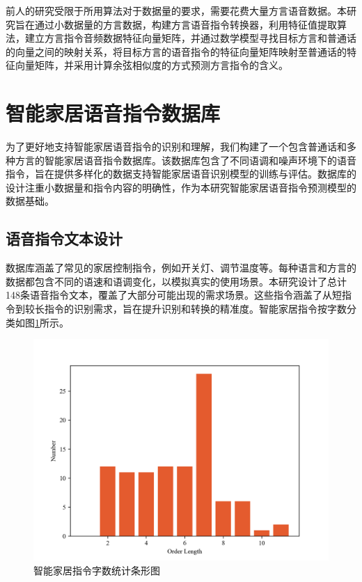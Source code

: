\documentclass[lang=cn,cite=super]{elegantpaper}
\begin{document}
前人的研究受限于所用算法对于数据量的要求，需要花费大量方言语音数据。本研究旨在通过小数据量的方言数据，构建方言语音指令转换器，利用特征值提取算法，建立方言指令音频数据特征向量矩阵，并通过数学模型寻找目标方言和普通话的向量之间的映射关系，将目标方言的语音指令的特征向量矩阵映射至普通话的特征向量矩阵，并采用计算余弦相似度的方式预测方言指令的含义。

\section{智能家居语音指令数据库}

为了更好地支持智能家居语音指令的识别和理解，我们构建了一个包含普通话和多种方言的智能家居语音指令数据库。该数据库包含了不同语调和噪声环境下的语音指令，旨在提供多样化的数据支持智能家居语音识别模型的训练与评估。数据库的设计注重小数据量和指令内容的明确性，作为本研究智能家居语音指令预测模型的数据基础。

\subsection{语音指令文本设计}

数据库涵盖了常见的家居控制指令，例如开关灯、调节温度等。每种语言和方言的数据都包含不同的语速和语调变化，以模拟真实的使用场景。本研究设计了总计148条语音指令文本，覆盖了大部分可能出现的需求场景。这些指令涵盖了从短指令到较长指令的识别需求，旨在提升识别和转换的精准度。智能家居指令按字数分类如图\ref{fig:order_word_counting}所示。

\begin{figure}[h]
    \caption{\label{fig:order_word_counting} 智能家居指令字数统计条形图}
    \centering
    \includegraphics[scale=0.4]{orders_classification.png}
\end{figure}
\end{document}
